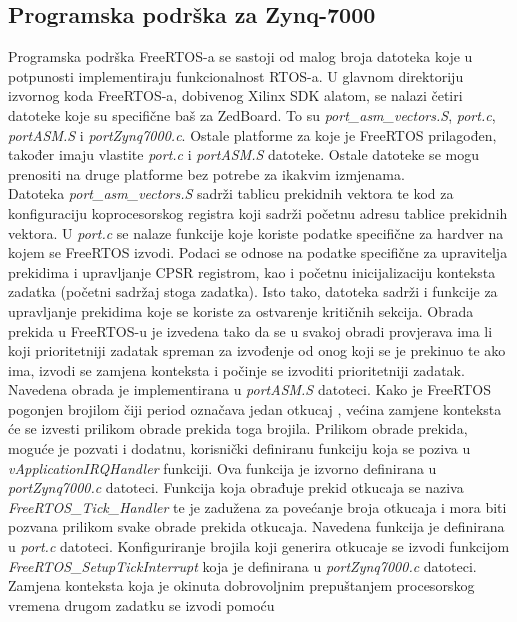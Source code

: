 \documentclass[times, utf8, diplomski, numeric]{fer}
\begin{document}
\subsection{Programska podrška za Zynq-7000}
Programska podrška FreeRTOS-a se sastoji od malog broja datoteka koje u potpunosti implementiraju funkcionalnost RTOS-a.
U glavnom direktoriju izvornog koda FreeRTOS-a, dobivenog Xilinx SDK alatom, se nalazi četiri datoteke koje su specifične
baš za ZedBoard. To su \textit{port\_asm\_vectors.S}, \textit{port.c}, \textit{portASM.S} i \textit{portZynq7000.c}. Ostale
platforme za koje je FreeRTOS prilagođen, također imaju vlastite \textit{port.c} i \textit{portASM.S} datoteke. Ostale
datoteke se mogu prenositi na druge platforme bez potrebe za ikakvim izmjenama.\\
Datoteka \textit{port\_asm\_vectors.S} sadrži tablicu prekidnih vektora te kod za konfiguraciju koprocesorskog registra koji
sadrži početnu adresu tablice prekidnih vektora. U \textit{port.c} se nalaze funkcije koje koriste podatke specifične za
hardver na kojem se FreeRTOS izvodi. Podaci se odnose na podatke specifične za upravitelja prekidima i upravljanje CPSR
registrom, kao i početnu inicijalizaciju konteksta zadatka (početni sadržaj stoga zadatka). Isto tako, datoteka sadrži i
funkcije za upravljanje prekidima koje se koriste za ostvarenje kritičnih sekcija. Obrada prekida u FreeRTOS-u je izvedena
tako da se u svakoj obradi provjerava ima li koji prioritetniji zadatak spreman za izvođenje od onog koji se je prekinuo te
ako ima, izvodi se zamjena konteksta i počinje se izvoditi prioritetniji zadatak. Navedena obrada je implementirana u
\textit{portASM.S} datoteci. Kako je FreeRTOS pogonjen brojilom čiji period označava jedan otkucaj , većina
zamjene konteksta će se izvesti prilikom obrade prekida toga brojila. Prilikom obrade prekida, moguće je pozvati i dodatnu,
korisnički definiranu funkciju koja se poziva u \textit{vApplicationIRQHandler} funkciji. Ova funkcija je izvorno definirana
u \textit{portZynq7000.c} datoteci. Funkcija koja obrađuje prekid otkucaja se naziva \textit{FreeRTOS\_Tick\_Handler} te
je zadužena za povećanje broja otkucaja i mora biti pozvana prilikom svake obrade prekida otkucaja. Navedena funkcija je
definirana u \textit{port.c} datoteci. Konfiguriranje brojila koji generira otkucaje se izvodi funkcijom
\textit{FreeRTOS\_SetupTickInterrupt} koja je definirana u \textit{portZynq7000.c} datoteci.\\
Zamjena konteksta koja je okinuta dobrovoljnim prepuštanjem procesorskog vremena drugom zadatku se izvodi pomoću
\end{document}
